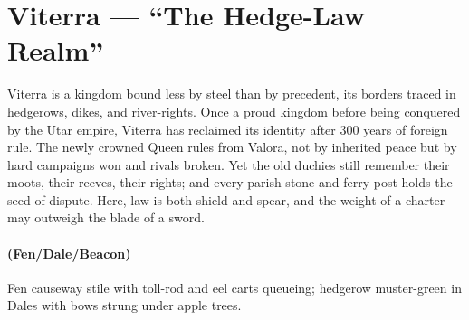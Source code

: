\section{Viterra --- ``The Hedge-Law Realm''}
\label{chap:viterra}

\begin{tcolorbox}[colback=black!3,colframe=black!40!white,title={Theme \& Atmosphere}]
Viterra is a kingdom bound less by steel than by precedent, its borders traced in hedgerows, dikes, and river-rights. Once a proud kingdom before being conquered by the Utar empire, Viterra has reclaimed its identity after 300 years of foreign rule. The newly crowned  Queen rules from Valora, not by inherited peace but by hard campaigns won and rivals broken. Yet the old duchies still remember their moots, their reeves, their rights; and every parish stone and ferry post holds the seed of dispute. Here,  law is both shield and spear, and the weight of a charter may outweigh the blade of a sword.
\end{tcolorbox}

\paragraph*{(Fen/Dale/Beacon)} Fen causeway stile with toll-rod and eel carts queueing; hedgerow muster-green in Dales with bows strung under apple trees.

